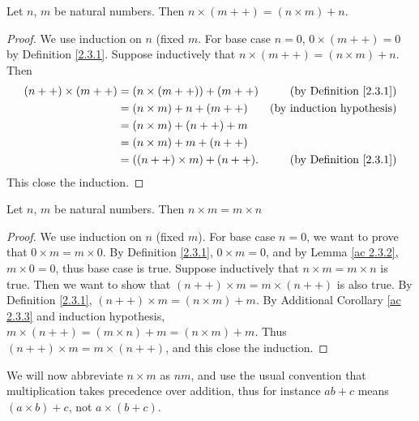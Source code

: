 \begin{additional corollary}\label{ac 2.3.3}
Let \(n\), \(m\) be natural numbers.
Then \(n \times (m++) = (n \times m) + n\).
\end{additional corollary}

\begin{proof}
We use induction on \(n\) (fixed \(m\).
For base case \(n = 0\), \(0 \times (m++) = 0\) by Definition \ref{2.3.1}.
Suppose inductively that \(n \times (m++) = (n \times m) + n\).
Then
    \begin{align*}
        (n++) \times (m++)
        &= (n \times (m++)) + (m++) & \text{(by Definition \ref{2.3.1})} \\
        &= (n \times m) + n + (m++) & \text{(by induction hypothesis)} \\
        &= (n \times m) + (n++) + m \\
        &= (n \times m) + m + (n++) \\
        &= ((n++) \times m) + (n++). & \text{(by Definition \ref{2.3.1})}
    \end{align*}
This close the induction.
\end{proof}

\begin{lemma}\label{2.3.2}
Let \(n\), \(m\) be natural numbers.
Then \(n \times m = m \times n\)
\end{lemma}

\begin{proof}
We use induction on \(n\) (fixed \(m\)).
For base case \(n = 0\), we want to prove that \(0 \times m = m \times 0\).
By Definition \ref{2.3.1}, \(0 \times m = 0\), and by Lemma \ref{ac 2.3.2}, \(m \times 0 = 0\), thus base case is true.
Suppose inductively that \(n \times m = m \times n\) is true.
Then we want to show that \((n++) \times m = m \times (n++)\) is also true.
By Definition \ref{2.3.1}, \((n++) \times m = (n \times m) + m\).
By Additional Corollary \ref{ac 2.3.3} and induction hypothesis, \(m \times (n++) = (m \times n) + m = (n \times m) + m\).
Thus \((n++) \times m = m \times (n++)\), and this close the induction.
\end{proof}

\begin{note}
We will now abbreviate \(n \times m\) as \(nm\), and use the usual convention that multiplication takes precedence over addition, thus for instance \(ab + c\) means \((a \times b) + c\), not \(a \times (b + c)\).
\end{note}

